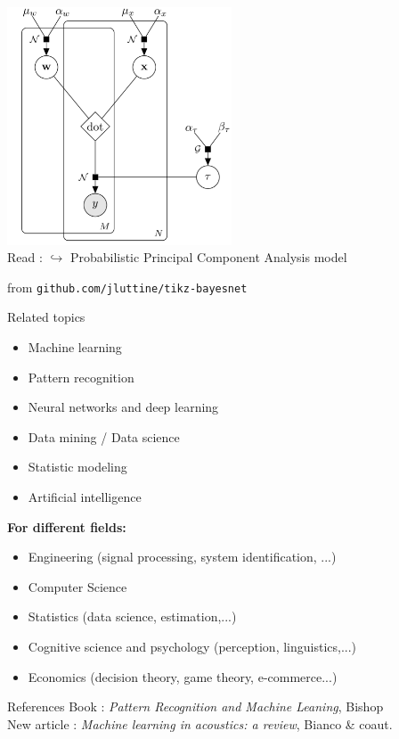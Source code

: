 \documentclass[10pt,xcolor=x11names,compress, show notes]{beamer}%
\begin{document}
\begin{frame}{\insertsectionhead}
\centering
\includegraphics[width=0.5\textwidth]{bayesnet2.png}\\
Read : 
$\hookrightarrow$ Probabilistic Principal Component Analysis model

\vfill
\scriptsize from \texttt{github.com/jluttine/tikz-bayesnet}
\end{frame}



\begin{frame}{Related topics}
\begin{itemize}
	\item Machine learning
        \item Pattern recognition
        \item Neural networks and deep learning
        \item Data mining / Data science
        \item Statistic modeling
        \item Artificial intelligence
\end{itemize}

\textbf{For different fields:}
\begin{itemize}
        \item Engineering (signal processing, system identification, ...)
        \item Computer Science 
        \item Statistics (data science, estimation,...)
        \item Cognitive science and psychology (perception, linguistics,...)
        \item Economics (decision theory, game theory, e-commerce...)
\end{itemize}
\end{frame}


\begin{frame}{References}
Book : \textit{Pattern Recognition and Machine Leaning},  Bishop\\
New article : \textit{Machine learning in acoustics: a review}, Bianco \& coaut.
\end{frame}
\end{document}
